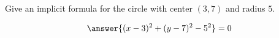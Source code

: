 \documentclass{ximera}
\author{Bart Snapp}
\begin{document}
\begin{exercise}
  Give an implicit formula for the circle with center $(3,7)$ and radius $5$.
  \begin{prompt}
  \[
  \answer{(x-3)^2 + (y-7)^2-5^2}=0
  \]
  \end{prompt}
\end{exercise}
\end{document}
